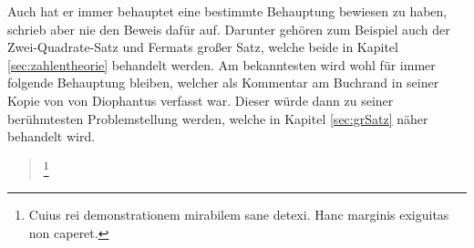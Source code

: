        Auch hat er immer behauptet eine bestimmte Behauptung bewiesen zu haben, schrieb aber nie den Beweis dafür auf. Darunter gehören zum Beispiel auch der Zwei-Quadrate-Satz und Fermats großer Satz, welche beide in Kapitel \ref{sec:zahlentheorie} behandelt werden. Am bekanntesten wird wohl für immer folgende Behauptung bleiben, welcher als Kommentar am Buchrand in seiner Kopie von \textit{} von Diophantus verfasst war. Dieser würde dann zu seiner berühmtesten Problemstellung werden, welche in Kapitel \ref{sec:grSatz} näher behandelt wird.

        \begin{quote}
            \footnote{Cuius rei demonstrationem mirabilem sane detexi. Hanc marginis exiguitas non caperet.}
        \end{quote}
